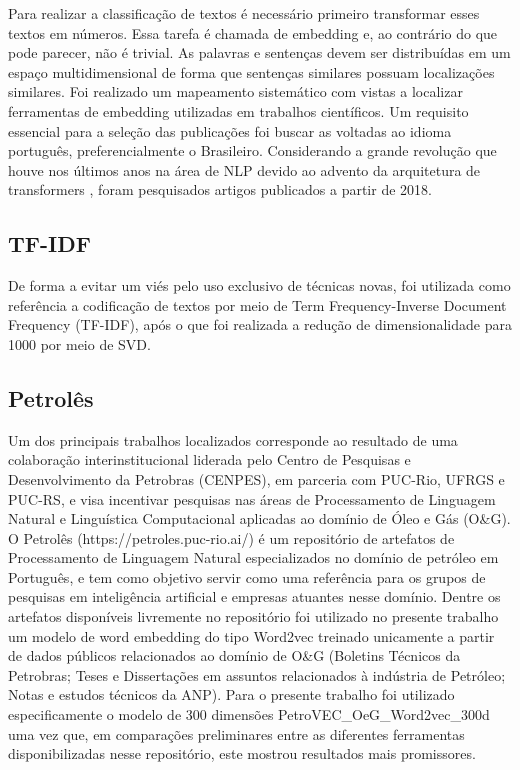 \documentclass[conference]{IEEEtran}
\begin{document}
  Para realizar a classificação de textos é necessário primeiro transformar esses textos em números. Essa tarefa é chamada de embedding e, ao contrário do que pode parecer, não é trivial. As palavras e sentenças devem ser distribuídas em um espaço multidimensional de forma que sentenças similares possuam localizações similares.
  Foi realizado um mapeamento sistemático com vistas a localizar ferramentas de embedding utilizadas em trabalhos científicos. Um requisito essencial para a seleção das publicações foi buscar as voltadas ao idioma português, preferencialmente o Brasileiro. Considerando a grande revolução que houve nos últimos anos na área de NLP devido ao advento da arquitetura de transformers \cite{NIPS2017_3f5ee243}, foram pesquisados artigos publicados a partir de 2018.

\subsection{TF-IDF}

  De forma a evitar um viés pelo uso exclusivo de técnicas novas, foi utilizada como referência a codificação de textos por meio de Term Frequency-Inverse Document Frequency (TF-IDF), após o que foi realizada a redução de dimensionalidade para 1000 por meio de SVD.

\subsection{Petrolês}
  
  Um dos principais trabalhos localizados \cite{Gomes2021} corresponde ao resultado de uma colaboração interinstitucional liderada pelo Centro de Pesquisas e Desenvolvimento da Petrobras (CENPES), em parceria com PUC-Rio, UFRGS e PUC-RS, e visa incentivar pesquisas nas áreas de Processamento de Linguagem Natural e Linguística Computacional aplicadas ao domínio de Óleo e Gás (O\&G).
  O Petrolês (https://petroles.puc-rio.ai/) é um repositório de artefatos de Processamento de Linguagem Natural especializados no domínio de petróleo em Português, e tem como objetivo servir como uma referência para os grupos de pesquisas em inteligência artificial e empresas atuantes nesse domínio. Dentre os artefatos disponíveis livremente no repositório foi utilizado no presente trabalho um modelo de word embedding do tipo Word2vec treinado unicamente a partir de dados públicos relacionados ao domínio de O\&G (Boletins Técnicos da Petrobras; Teses e Dissertações em assuntos relacionados à indústria de Petróleo; Notas e estudos técnicos da ANP).
  Para o presente trabalho foi utilizado especificamente o modelo de 300 dimensões PetroVEC\_OeG\_Word2vec\_300d uma vez que, em comparações preliminares entre as diferentes ferramentas disponibilizadas nesse repositório, este mostrou resultados mais promissores.
\end{document}
